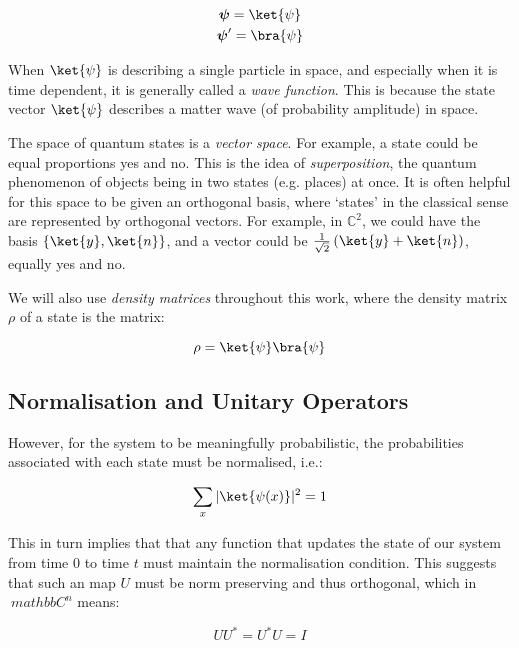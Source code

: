 \begin{gather}\label{eq:braket}
\boldsymbol{\psi} = \ket{\psi}\\
\boldsymbol{\psi}' = \bra{\psi} 
\end{gather}

When $\ket{\psi}$ is describing a single particle in space, and especially when it is time dependent, it is generally called a \textit{wave function}. This is because the state vector $\ket{\psi}$ describes a matter wave (of probability amplitude) in space. 

The space of quantum states is a \textit{vector space}. For example, a state could be equal proportions yes and no. This is the idea of \textit{superposition}, the quantum phenomenon of objects being in two states (e.g. places) at once. It is often helpful for this space to be given an orthogonal basis, where `states' in the classical sense are represented by orthogonal vectors. For example, in $\mathbb{C}^2$, we could have the basis $\{ \ket{y}, \ket{n} \}$, and a vector could be $\frac{1}{\sqrt{2}}\left (\ket{y} + \ket{n} \right)$, equally yes and no. 

We will also use \textit{density matrices} throughout this work, where the density matrix $\rho$ of a state is the matrix:

\begin{equation}\label{eq:density_matrix}
	\rho = \ket{\psi}\bra{\psi}
\end{equation}


\subsection{Normalisation and Unitary Operators}\label{subsec:normalisation}
However, for the system to be meaningfully probabilistic, the probabilities associated with each state must be normalised, i.e.:

\begin{equation}\label{eq:normalisation}
\sum_x |\ket{\psi(x)}|^2 = 1
\end{equation}

This in turn implies that that any function that updates the state of our system from time $0$ to time $t$ must maintain the normalisation condition. This suggests that such an map $U$ must be norm preserving and thus orthogonal, which in $\ mathbb{C}^n$ means:


\begin{equation}\label{eq:unitarity}
	UU^* = U^*U = I
\end{equation}


